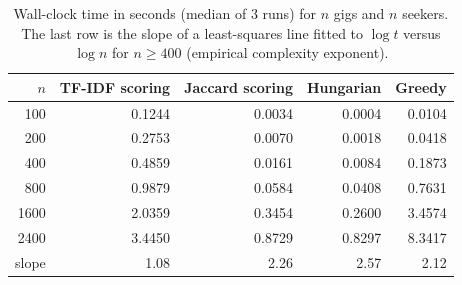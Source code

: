 \begin{table}[htbp]
\centering
\small
\caption{Wall-clock time in seconds (median of 3 runs) for $n$ gigs and $n$ seekers. The last row is the slope of a least-squares line fitted to $\log t$ versus $\log n$ for $n \ge 400$ (empirical complexity exponent).}
\label{tab:runtime}
\begin{tabular}{rrrrr}
\toprule
$n$ & TF-IDF scoring & Jaccard scoring & Hungarian & Greedy \\
\midrule
100 & 0.1244 & 0.0034 & 0.0004 & 0.0104 \\
200 & 0.2753 & 0.0070 & 0.0018 & 0.0418 \\
400 & 0.4859 & 0.0161 & 0.0084 & 0.1873 \\
800 & 0.9879 & 0.0584 & 0.0408 & 0.7631 \\
1600 & 2.0359 & 0.3454 & 0.2600 & 3.4574 \\
2400 & 3.4450 & 0.8729 & 0.8297 & 8.3417 \\
\midrule
slope & 1.08 & 2.26 & 2.57 & 2.12 \\
\bottomrule
\end{tabular}
\end{table}
